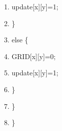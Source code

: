 \documentclass{article}
\begin{document}
\begin{shadebox}
\begin{enumerate}
\item \hspace{10pt} \hspace{10pt} \hspace{10pt}                         update[x][y]=1;
\item \hspace{10pt} \hspace{10pt}                 \} 
\item \hspace{10pt} \hspace{10pt}                 else \{
\item \hspace{10pt} \hspace{10pt} \hspace{10pt}                         GRID[x][y]=0;
\item \hspace{10pt} \hspace{10pt} \hspace{10pt}                         update[x][y]=1;
\item \hspace{10pt} \hspace{10pt}                 \}
\item \hspace{10pt}         \}
\item \}
\end{enumerate}
\end{shadebox}
\end{document}
